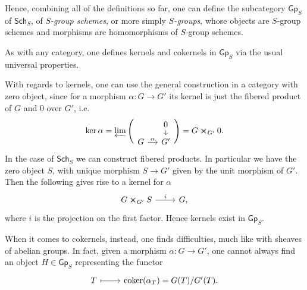 \begin{defn}\label{defn:CatOfGroupSchemes}
	Hence, combining all of the definitions so far, 
	one can define the subcategory $\mathsf{Gp}_S$ of $\mathsf{Sch}_{ S }$,
	of {\em $S$-group schemes}, or more simply {\em $S$-groups},
	whose objects are $S$-group schemes
	and morphisms are homomorphisms of $S$-group schemes.
\end{defn}


\begin{rem}
	As with any category, one defines kernels and cokernels 
	in $\mathsf{Gp}_S$ via the usual universal properties.

	With regards to kernels, one can use the general construction 
	in a category with zero object,
	since for a morphism $\alpha\colon G \to G'$ its kernel
	is just the fibered product of $G$ and $0$ over $G'$, i.e.
	\begin{equation*}
		\ker \alpha =
		\varprojlim \Bigg(
			\begin{tikzcd}[row sep=0.60em, column sep=1.2em]
			&
			0 \arrow[d, "", rightarrow] \\
			G \arrow[r, "\alpha", rightarrow] &
			G'
		\end{tikzcd} \Bigg)
		= G \cross_{G'} 0
	.\end{equation*}
	In the case of $\mathsf{Sch}_{ S }$ we can construct fibered products.
	In particular we have the zero object $S$, with unique morphism
	$S \to G'$ given by the unit morphism of $G'$.
	Then the following gives rise to a kernel for $\alpha$
	\begin{equation*}
	\begin{tikzcd}
		G \cross_{ G' } S \arrow[r, "i", rightarrow] &
		G,
	\end{tikzcd}
	\end{equation*} 
	where $i$ is the projection on the first factor.
	Hence kernels exist in $\mathsf{Gp}_S$.
	
	When it comes to cokernels, instead, one finds difficulties, much like
	with sheaves of abelian groups.
	In fact, given a morphism $\alpha\colon G \to G'$, one cannot always find an
	object $H \in \mathsf{Gp}_S$ representing the functor
	\begin{equation*}
	\begin{tikzcd}
		T \arrow[r, "", mapsto] &
		\coker (\alpha_T) =
		G(T)/G'(T).
	\end{tikzcd}
	\end{equation*}
\end{rem}



